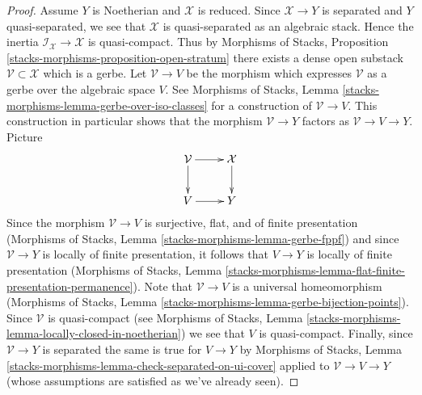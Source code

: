 \documentclass{stacks-project}
\theoremstyle{plain}
\theoremstyle{definition}
\theoremstyle{remark}
\numberwithin{equation}{subsection}
\begin{document}
\begin{proof}
\medskip\noindent
Assume $Y$ is Noetherian and $\mathcal{X}$ is reduced.
Since $\mathcal{X} \to Y$ is separated and $Y$ quasi-separated,
we see that $\mathcal{X}$ is quasi-separated as an algebraic stack.
Hence the inertia $\mathcal{I}_\mathcal{X} \to \mathcal{X}$
is quasi-compact. Thus by Morphisms of Stacks, Proposition
\ref{stacks-morphisms-proposition-open-stratum}
there exists a dense open substack $\mathcal{V} \subset \mathcal{X}$
which is a gerbe. Let $\mathcal{V} \to V$ be the morphism
which expresses $\mathcal{V}$ as a gerbe over the algebraic space $V$.
See
Morphisms of Stacks, Lemma \ref{stacks-morphisms-lemma-gerbe-over-iso-classes}
for a construction of $\mathcal{V} \to V$.
This construction in particular shows that the morphism
$\mathcal{V} \to Y$ factors as $\mathcal{V} \to V \to Y$.
Picture
$$
\xymatrix{
\mathcal{V} \ar[r] \ar[d] & \mathcal{X} \ar[d] \\
V \ar[r] & Y
}
$$
Since the morphism $\mathcal{V} \to V$ is surjective, flat, and
of finite presentation
(Morphisms of Stacks, Lemma \ref{stacks-morphisms-lemma-gerbe-fppf})
and since $\mathcal{V} \to Y$ is locally of finite presentation,
it follows that $V \to Y$ is locally of finite presentation
(Morphisms of Stacks, Lemma
\ref{stacks-morphisms-lemma-flat-finite-presentation-permanence}).
Note that $\mathcal{V} \to V$ is a universal homeomorphism
(Morphisms of Stacks, Lemma
\ref{stacks-morphisms-lemma-gerbe-bijection-points}).
Since $\mathcal{V}$ is quasi-compact (see
Morphisms of Stacks, Lemma
\ref{stacks-morphisms-lemma-locally-closed-in-noetherian})
we see that $V$ is quasi-compact.
Finally, since $\mathcal{V} \to Y$ is separated the same is true
for $V \to Y$ by
Morphisms of Stacks, Lemma
\ref{stacks-morphisms-lemma-check-separated-on-ui-cover}
applied to $\mathcal{V} \to V \to Y$
(whose assumptions are satisfied as we've already seen).


\end{proof}
\end{document}
